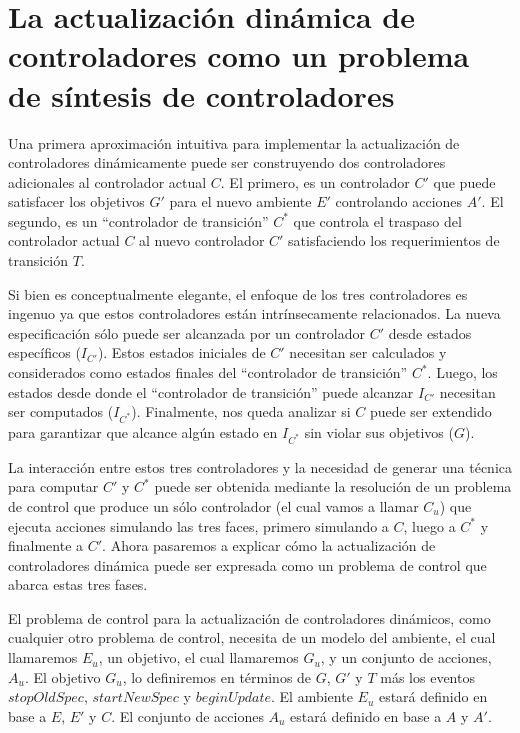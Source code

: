 \section{La actualización dinámica de controladores como un problema de síntesis de controladores}

Una primera aproximación intuitiva para implementar la actualización de controladores dinámicamente puede ser
construyendo dos controladores adicionales al controlador actual $C$. El primero, es un controlador $C'$ que puede
satisfacer los objetivos $G'$ para el nuevo ambiente $E'$ controlando acciones $A'$. El segundo, es un ``controlador de
transición'' $C^*$ que controla el traspaso del controlador actual $C$ al nuevo controlador $C'$ satisfaciendo los
requerimientos de transición $T$.

Si bien es conceptualmente elegante, el enfoque de los tres controladores es ingenuo ya que estos controladores están
intrínsecamente relacionados. La nueva especificación sólo puede ser alcanzada por un controlador $C'$ desde estados
específicos ($I_{C'}$). Estos estados iniciales de $C'$ necesitan ser calculados y considerados como estados finales del
``controlador de transición'' $C^*$. Luego, los estados desde donde el ``controlador de transición'' puede alcanzar
$I_{C'}$ necesitan ser computados ($I_{C^*}$). Finalmente, nos queda analizar si $C$ puede ser extendido para
garantizar que alcance algún estado en $I_{C^*}$ sin violar sus objetivos ($G$).

La interacción entre estos tres controladores y la necesidad de generar una técnica para computar $C'$ y $C^*$ puede ser
obtenida mediante la resolución de un problema de control que produce un sólo controlador (el cual vamos a llamar $C_u$)
que ejecuta acciones simulando las tres faces, primero simulando a $C$, luego a $C^*$ y finalmente a $C'$. Ahora
pasaremos a explicar cómo la actualización de controladores dinámica puede ser expresada como un problema de control que
abarca estas tres fases.

El problema de control para la actualización de controladores dinámicos, como cualquier otro problema de control,
necesita de un modelo del ambiente, el cual llamaremos $E_u$, un objetivo, el cual llamaremos $G_u$, y un conjunto de
acciones, $A_u$. El objetivo $G_u$, lo definiremos en términos de $G$, $G'$ y $T$ más los eventos $stopOldSpec$,
$startNewSpec$ y $beginUpdate$. El ambiente $E_u$ estará definido en base a $E$, $E'$ y $C$. El conjunto de acciones
$A_u$ estará definido en base a $A$ y $A'$.

